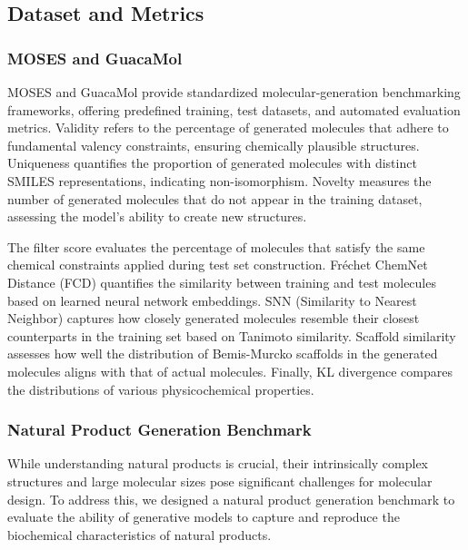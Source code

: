 \subsection{Dataset and Metrics}
\label{appsubsec:dataset_and_metrics}


\subsubsection{MOSES and GuacaMol}
\label{appsubsubsec:moses_and_guacamol}

MOSES and GuacaMol provide standardized molecular-generation benchmarking frameworks, offering predefined training, test datasets, and automated evaluation metrics. Validity refers to the percentage of generated molecules that adhere to fundamental valency constraints, ensuring chemically plausible structures. Uniqueness quantifies the proportion of generated molecules with distinct SMILES representations, indicating non-isomorphism. Novelty measures the number of generated molecules that do not appear in the training dataset, assessing the model’s ability to create new structures.

The filter score evaluates the percentage of molecules that satisfy the same chemical constraints applied during test set construction. Fréchet ChemNet Distance (FCD) quantifies the similarity between training and test molecules based on learned neural network embeddings. SNN (Similarity to Nearest Neighbor) captures how closely generated molecules resemble their closest counterparts in the training set based on Tanimoto similarity. Scaffold similarity assesses how well the distribution of Bemis-Murcko scaffolds in the generated molecules aligns with that of actual molecules. Finally, KL divergence compares the distributions of various physicochemical properties.


\subsubsection{Natural Product Generation Benchmark}
\label{appsubsubsec:natural_product_generation_benchmark}

While understanding natural products is crucial, their intrinsically complex structures and large molecular sizes pose significant challenges for molecular design.
To address this, we designed a natural product generation benchmark to evaluate the ability of generative models to capture and reproduce the biochemical characteristics of natural products.

